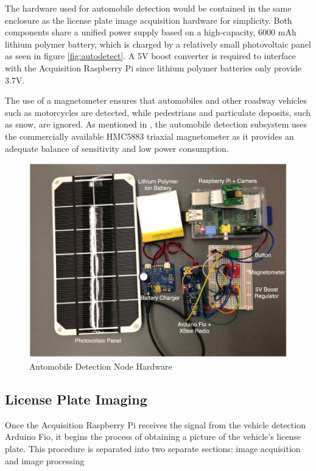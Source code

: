 \documentclass[11pt, oneside, fullpage, doublespace]{article}
\begin{document}
The hardware used for automobile detection would be contained in the same enclosure as the license plate image acquisition hardware for simplicity. Both components share a unified power supply based on a high-capacity, 6000 mAh lithium polymer battery, which is charged by a relatively small photovoltaic panel as seen in figure \ref{fig:autodetect}. A 5V boost converter is required to interface with the Acquisition Raspberry Pi since lithium polymer batteries only provide 3.7V.

The use of a magnetometer ensures that automobiles and other roadway vehicles such as motorcycles are detected, while pedestrians and particulate deposits, such as snow, are ignored. As mentioned in \cite{stillwell2013}, the automobile detection subsystem uses the commercially available HMC5883 triaxial magnetometer as it provides an adequate balance of sensitivity and low power consumption.

\begin{figure}
\begin{center}
\includegraphics[width=4.5in]{sensornode}
\end{center}
\caption{Automobile Detection Node Hardware}
\label{fig:autodetecthardware}
\end{figure}

\subsection{License Plate Imaging}
Once the Acquisition Raspberry Pi receives the signal from the vehicle detection Arduino Fio, it begins the process of obtaining a picture of the vehicle's license plate. This procedure is separated into two separate sections: image acquisition and image processing
\end{document}
